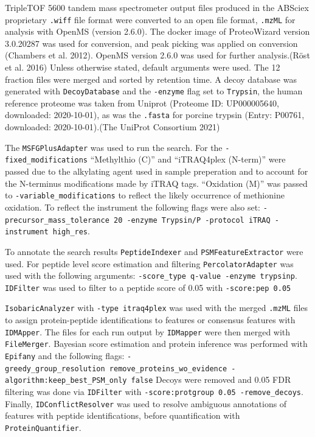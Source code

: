 \documentclass[9pt,lineno]{elife}
\begin{document}
TripleTOF 5600 tandem mass spectrometer output files produced in the ABSciex proprietary \texttt{.wiff} file format were converted to an open file format, \texttt{.mzML} for analysis with OpenMS (version 2.6.0). The docker image of ProteoWizard version 3.0.20287 was used for conversion, and peak picking was applied on conversion (Chambers et al. 2012). OpenMS version 2.6.0 was used for further analysis.(Röst et al. 2016)
Unless otherwise stated, default arguments were used.
The 12 fraction files were merged and sorted by retention time.
A decoy database was generated with \texttt{DecoyDatabase} and the \texttt{-enzyme} flag set to \texttt{Trypsin}, the human reference proteome was taken from Uniprot (Proteome ID: UP000005640, downloaded: 2020-10-01), as was the \texttt{.fasta} for porcine trypsin (Entry: P00761, downloaded: 2020-10-01).(The UniProt Consortium 2021)

The \texttt{MSFGPlusAdapter} was used to run the search.
For the \texttt{-fixed\_modifications} ``Methylthio (C)'' and ``iTRAQ4plex (N-term)'' were passed due to the alkylating agent used in sample preperation and to account for the N-terminus modifications made by iTRAQ tags.
``Oxidation (M)'' was passed to \texttt{-variable\_modifications} to reflect the likely occurrence of methionine oxidation.
To reflect the instrument the following flags were also set: \texttt{-precursor\_mass\_tolerance\ 20\ -enzyme\ Trypsin/P\ -protocol\ iTRAQ\ -instrument\ high\_res}.

To annotate the search results \texttt{PeptideIndexer} and \texttt{PSMFeatureExtractor} were used.
For peptide level score estimation and filtering \texttt{PercolatorAdapter} was used with the following arguments: \texttt{-score\_type\ q-value\ -enzyme\ trypsinp}.
\texttt{IDFilter} was used to filter to a peptide score of 0.05 with \texttt{-score:pep\ 0.05}

\texttt{IsobaricAnalyzer} with \texttt{-type\ itraq4plex} was used with the merged \texttt{.mzML} files to assign protein-peptide identifications to features or consensus features with \texttt{IDMApper}.
The files for each run output by \texttt{IDMapper} were then merged with \texttt{FileMerger}.
Bayesian score estimation and protein inference was performed with \texttt{Epifany} and the following flags: \texttt{-greedy\_group\_resolution\ remove\_proteins\_wo\_evidence\ -algorithm:keep\_best\_PSM\_only\ false}
Decoys were removed and 0.05 FDR filtering was done via \texttt{IDFilter} with \texttt{-score:protgroup\ 0.05\ -remove\_decoys}.
Finally, \texttt{IDConflictResolver} was used to resolve ambiguous annotations of features with peptide identifications, before quantification with \texttt{ProteinQuantifier}.
\end{document}
